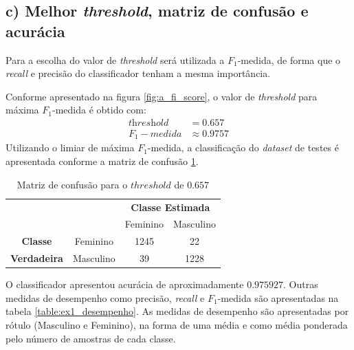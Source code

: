 \documentclass{article}
\begin{document}
    \subsection[]{c) Melhor \textit{threshold}, matriz de confusão e acurácia}
    Para a escolha do valor de \textit{threshold} será utilizada a $F_1$-medida, de forma que
    o \textit{recall} e precisão do classificador tenham a mesma importância.

    Conforme apresentado na figura \ref{fig:a_fi_score}, o valor de \textit{threshold} para máxima $F_1$-medida é
    obtido com:
    \begin{align*}
        \textit{threshold}&=0.657 \\
        F_1-medida&\approx0.9757
    \end{align*}
    Utilizando o limiar de máxima $F_1$-medida, a classificação do \textit{dataset} de testes é 
    apresentada conforme a matriz de confusão \ref{ex1_cm}.
    \begin{table}[]
        \begin{tabular}{cccc}
            &  & \multicolumn{2}{c}{\textbf{Classe Estimada}} \\
            &  & Feminino & Masculino \\ \cline{3-4} 
            \textbf{Classe} & \multicolumn{1}{c|}{Feminino} & \multicolumn{1}{c|}{1245} & \multicolumn{1}{c|}{22} \\ \cline{3-4} 
            \textbf{Verdadeira} & \multicolumn{1}{c|}{Masculino} & \multicolumn{1}{c|}{39} & \multicolumn{1}{c|}{1228} \\ \cline{3-4} 
        \end{tabular}
        \caption{Matriz de confusão para o $threshold$ de $0.657$}
        \label{ex1_cm}
    \end{table}
    O classificador apresentou acurácia de aproximadamente $0.975927$. Outras medidas de desempenho como precisão, \textit{recall} e
    $F_1$-medida são apresentadas na tabela \ref{table:ex1_desempenho}. As medidas de desempenho são apresentadas por rótulo (Masculino e Feminino),
    na forma de uma média e como média ponderada pelo número de amostras de cada classe.
\end{document}
